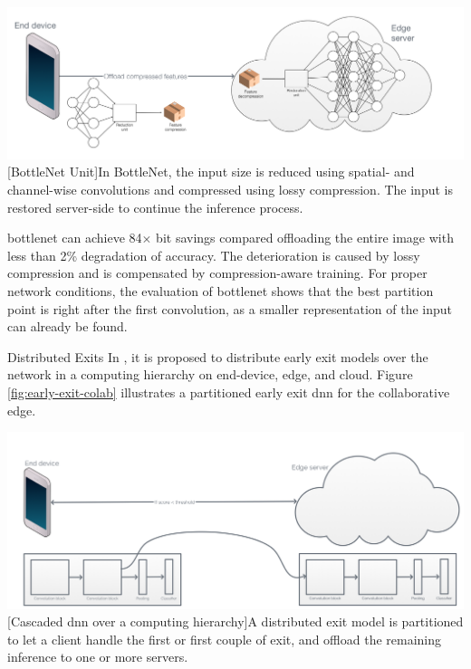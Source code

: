 \begin{enumdescript}
	\begin{minipage}[t]{\linewidth}
		\centering
		\includegraphics[width=.8\linewidth]{figures/models/bottlenet}
		[BottleNet Unit]{In BottleNet, the input size is reduced using spatial- and channel-wise convolutions and compressed using lossy compression. The input is restored server-side to continue the inference process.}
	\end{minipage}
	
	\gls{bottlenet} can achieve 84$\times$ bit savings compared offloading the entire image with less than 2\% degradation of accuracy. The deterioration is caused by lossy compression and is compensated by compression-aware training. For proper network conditions, the evaluation of \gls{bottlenet} shows that the best partition point is right after the first convolution, as a smaller representation of the input can already be found. 	
	\item[Distributed Exits] In \cite{leroux_cascading_2017,teerapittayanon_distributed_2017}, it is proposed to distribute early exit models over the network in a computing hierarchy on end-device, edge, and cloud. Figure \ref{fig:early-exit-colab} illustrates a partitioned early exit \gls{dnn} for the collaborative edge. 
	
	\begin{minipage}[t]{\linewidth}
		\centering
		\includegraphics[width=\linewidth]{figures/models/Dist_exits}
		[Cascaded \gls{dnn} over a computing hierarchy]{A distributed exit model is partitioned to let a client handle the first or first couple of exit, and offload the remaining inference to one or more servers.}
		\label{fig:early-exit-colab}
	\end{minipage}


\end{enumdescript}

